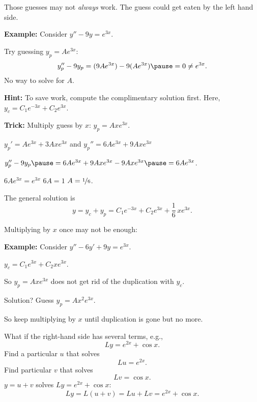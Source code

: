 \documentclass[10pt,aspectratio=169]{beamer}
\begin{document}
\begin{frame}
Those guesses may not \emph{always} work. \pause
The guess could get eaten by the left hand side.

\medskip
\pause

\textbf{Example:}
Consider
\quad $y'' - 9y = e^{3x}$.

\medskip
\pause

Try guessing \quad $y_p = Ae^{3x}$:
\pause
\[
y_p''-9y_p = (9Ae^{3x}) - 9(Ae^{3x}) \pause = 0 \not= e^{3x} .
\]
\pause
No way to solve for $A$.

\medskip
\pause

\textbf{Hint:} To save work, compute the complimentary solution first.
Here, $y_c = C_1 e^{-3x} + C_2 e^{3x}$.

\medskip
\pause

\textbf{Trick:} Multiply guess by $x$: \quad $y_p = Axe^{3x}$.

\medskip
\pause

\quad $y_p' = Ae^{3x} + 3Axe^{3x}$ \quad and \quad $y_p'' = 6Ae^{3x} + 9Axe^{3x}$

\medskip
\pause

\quad $y_p'' -9y_p \pause = 6Ae^{3x} + 9Axe^{3x} - 9Axe^{3x} \pause = 6Ae^{3x}$.

\medskip
\pause

\thus \quad $6Ae^{3x} = e^{3x}$ \wthus $6A = 1$ \wthus $A=\nicefrac{1}{6}$.

\medskip
\pause

The general solution is
\[
y = y_c + y_p = 
C_1 e^{-3x} + C_2 e^{3x} + \frac{1}{6}\,xe^{3x} .
\]
\end{frame}

\begin{frame}
Multiplying by $x$ once may not be enough:

\medskip

\textbf{Example:}
Consider
\quad
$y''-6y'+9y = e^{3x}$.

\medskip
\pause

\quad $y_c = C_1 e^{3x} + C_2 x e^{3x}$.

\medskip
\pause

So $y_p = A xe^{3x}$ does not get rid of the duplication with $y_c$.

\medskip
\pause

Solution? \pause Guess \quad $y_p = Ax^2e^{3x}$.

\pause
\medskip
So keep multiplying by $x$ until duplication is gone but no more.
\end{frame}

\begin{frame}
What if the right-hand side has several terms, e.g.,
\[
Ly = e^{2x} + \cos x .
\]
\pause
Find a particular $u$ that solves
\[
Lu = e^{2x} .
\]
\pause
Find particular $v$ that solves
\[
Lv = \cos x .
\]
\pause
$y=u+v$ \quad solves \quad
$Ly = e^{2x} + \cos x$:
\[
Ly=L(u+v) = Lu+Lv = e^{2x} + \cos x .
\]
\end{frame}
\end{document}
